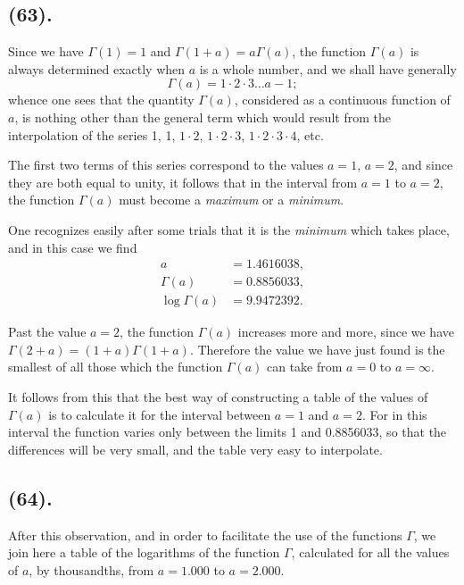 \documentclass{article}
\begin{document}

\subsection*{(63).}

Since we have $\Gamma(1)=1$ and $\Gamma(1+a)=a\Gamma(a)$, the function $\Gamma(a)$ is always determined exactly when $a$ is a whole number, and we shall have generally
\[ \Gamma(a)=1\cdot 2\cdot 3\ldots a-1; \]
whence one sees that the quantity $\Gamma(a)$, considered as a continuous function of $a$, is nothing other than the general term which would result from the interpolation of the series 1, 1, $1\cdot 2$, $1\cdot 2\cdot 3$, $1\cdot 2\cdot 3\cdot 4$, etc.

The first two terms of this series correspond to the values $a=1$, $a=2$, and since they are both equal to unity, it follows that in the interval from $a=1$ to $a=2$, the function $\Gamma(a)$ must become a \emph{maximum} or a \emph{minimum}.

One recognizes easily after some trials that it is the \emph{minimum} which takes place, and in this case we find
\[ \begin{aligned} a&=1.4616038,\\ \Gamma(a)&=0.8856033,\\ \log\Gamma(a)&=9.9472392. \end{aligned} \]

Past the value $a=2$, the function $\Gamma(a)$ increases more and more, since we have $\Gamma(2+a)=(1+a)\Gamma(1+a)$. Therefore the value we have just found is the smallest of all those which the function $\Gamma(a)$ can take from $a=0$ to $a=\infty$.

It follows from this that the best way of constructing a table of the values of $\Gamma(a)$ is to calculate it for the interval between $a=1$ and $a=2$. For in this interval the function varies only between the limits 1 and 0.8856033, so that the differences will be very small, and the table very easy to interpolate.

\subsection*{(64).}

After this observation, and in order to facilitate the use of the functions $\Gamma$, we join here a table of the logarithms of the function $\Gamma$, calculated for all the values of $a$, by thousandths, from $a=1.000$ to $a=2.000$.
\end{document}
